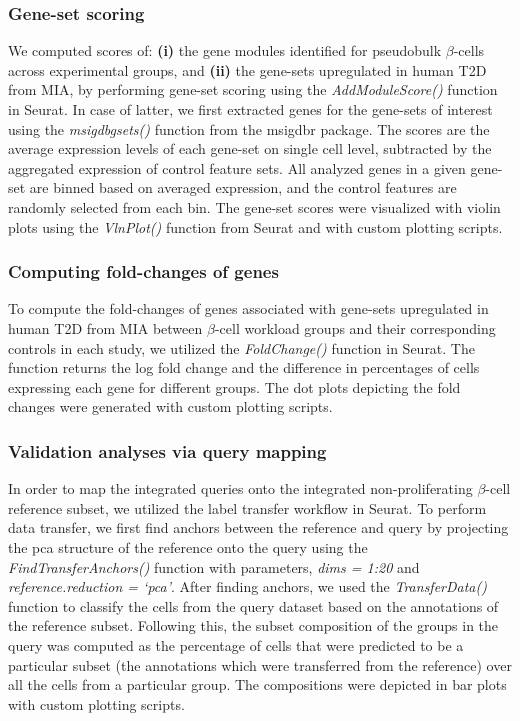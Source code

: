 \subsubsection{\large Gene-set scoring}
We computed scores of: \textbf{(i)} the gene modules identified for pseudobulk $\beta$-cells across experimental groups, and \textbf{(ii)} the gene-sets upregulated in human T2D from MIA, by performing gene-set scoring using the \textit{AddModuleScore()} function in Seurat. In case of latter, we first extracted genes for the gene-sets of interest using the \textit{msigdb\textunderscore gsets()} function from the msigdbr package. The scores are the average expression levels of each gene-set on single cell level, subtracted by the aggregated expression of control feature sets. All analyzed genes in a given gene-set are binned based on averaged expression, and the control features are randomly selected from each bin. The gene-set scores were visualized with violin plots using the \textit{VlnPlot()} function from Seurat and with custom plotting scripts.

\subsubsection{\large Computing fold-changes of genes}
To compute the fold-changes of genes associated with gene-sets upregulated in human T2D from MIA between $\beta$-cell workload groups and their corresponding controls in each study, we utilized the \textit{FoldChange()} function in Seurat. The function returns the log fold change and the difference in percentages of cells expressing each gene for different groups. The dot plots depicting the fold changes were generated with custom plotting scripts. 

\subsubsection{\large Validation analyses via query mapping}
In order to map the integrated queries onto the integrated non-proliferating $\beta$-cell reference subset, we utilized the label transfer workflow in Seurat. To perform data transfer, we first find anchors between the reference and query by projecting the \gls{pca} structure of the reference onto the query using the \textit{FindTransferAnchors()} function with parameters, \textit{dims = 1:20} and \textit{reference.reduction = `pca'}. After finding anchors, we used the \textit{TransferData()} function to classify the cells from the query dataset based on the annotations of the reference subset. Following this, the subset composition of the groups in the query was computed as the percentage of cells that were predicted to be a particular subset (the annotations which were transferred from the reference) over all the cells from a particular group. The compositions were depicted in bar plots with custom plotting scripts.


